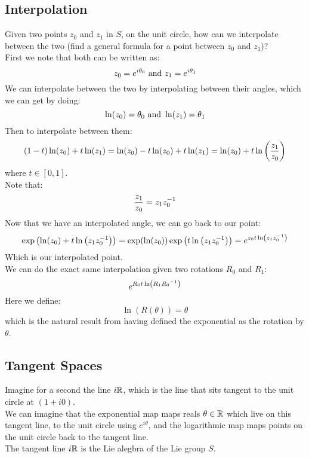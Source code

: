 \documentclass[12pt]{article}
\begin{document}
\newpage

\subsection*{Interpolation}

Given two points $z_0$ and $z_1$ in $S$,
on the unit circle, how can we interpolate
between the two (find a general formula
for a point between $z_0$ and $z_1$)? \\

First we note that both can be written as:
\[ z_0 = e^{i\theta_0} \text{ and }
z_1 = e^{i\theta_1} \]
We can interpolate between the two
by interpolating between their angles,
which we can get by doing:
\[ \ln(z_0) = \theta_0 \text{ and } 
\ln(z_1) = \theta_1 \]
Then to interpolate between them:
\[ (1-t)\ln(z_0) + t\ln(z_1)
= \ln(z_0) -t\ln(z_0) + t\ln(z_1) 
= \ln(z_0) + t\ln\left( \dfrac{z_1}{z_0} \right) \]
where $t \in [0, 1]$. \\
Note that:
\[ \dfrac{z_1}{z_0} = z_1z_0^{-1} \]
Now that we have an interpolated angle,
we can go back to our point:
\[ \exp\left( \ln(z_0) + t\ln\left( z_1z_0^{-1} \right) \right)
= \exp(\ln(z_0))
\exp\left( {t\ln\left( z_1z_0^{-1} \right)}  \right)
= e^{{z_0t\ln\left( z_1z_0^{-1} \right)}} \]
Which is our interpolated point. \\

We can do the exact same interpolation
given two rotations $R_0$ and $R_1$:
\[ e^{{R_0t\ln\left( {R_1}{R_0}^{-1} \right)}} \]
Here we define:
\[ \ln(R(\theta)) = \theta \]
which is the natural result from having
defined the exponential as the
rotation by $\theta$. \\

\newpage

\subsection*{Tangent Spaces}

Imagine for a second the line $i\mathbb{R}$,
which is the line that sits tangent
to the unit circle at $(1 + i0)$. \\
We can imagine that the exponential map
maps reals $\theta \in \mathbb{R}$ which live on this
tangent line, to the unit circle using
$e^{i\theta}$,
and the logarithmic map maps points on the
unit circle back to the tangent line. \\
The tangent line $i\mathbb{R}$ is the Lie alegbra
of the Lie group $S$. \\
\end{document}
